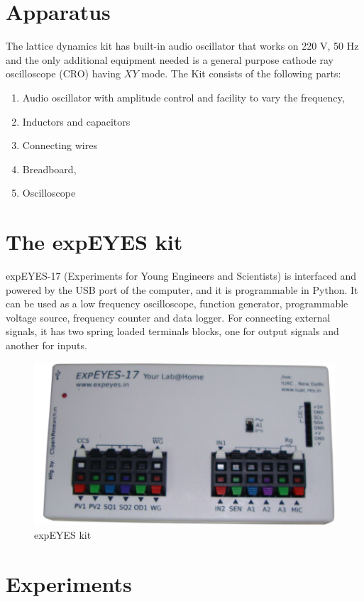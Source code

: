 \documentclass[%
 aip,
 amsmath,amssymb,
 reprint, floatfix%
]{revtex4-1}
\begin{document}
\section{Apparatus}
    The lattice dynamics kit has built-in audio oscillator that works on 220 V, 50 Hz and the only additional equipment needed is a general purpose cathode ray oscilloscope (CRO) having $XY$ mode. The Kit consists of the following parts:
    \begin{enumerate}
        \item Audio oscillator with amplitude control and facility to vary the frequency,
        \item Inductors and capacitors
        \item Connecting wires
        \item Breadboard,
        \item Oscilloscope
    \end{enumerate}


\section{The expEYES kit}
    expEYES-17 (Experiments for Young Engineers and Scientists) is interfaced and powered by the USB port of the computer, and it is programmable in Python. It can be used as a low frequency oscilloscope, function generator, programmable voltage source, frequency counter and data logger. For connecting external signals, it has two spring loaded terminals blocks, one for output signals and another for inputs.
    \begin{figure}
        \centering
        \includegraphics[scale = 0.7]{Figures/expeyes.png}
        \caption{expEYES kit}
        \label{fig:expeyes}
    \end{figure}

\section{Experiments}
\end{document}
